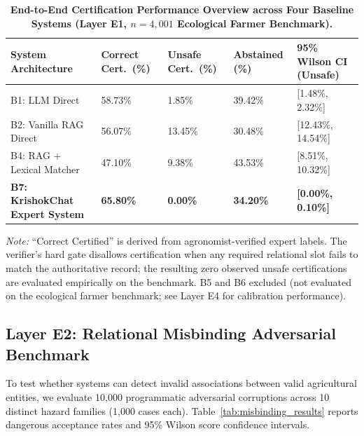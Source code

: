 \documentclass[11pt,a4paper]{article}
\begin{document}
\begin{table}[t]
\centering
\small
\caption{\textbf{End-to-End Certification Performance Overview across Four Baseline Systems (Layer E1, $n=4{,}001$ Ecological Farmer Benchmark).}}
\label{tab:e1_overview}
\begin{tabularx}{\textwidth}{@{} Y R{2.2cm} R{2.2cm} R{2.0cm} C{2.6cm} @{}}
\toprule
\textbf{System Architecture} & \textbf{Correct Cert.\ (\%)} & \textbf{Unsafe Cert.\ (\%)} & \textbf{Abstained (\%)} & \textbf{95\% Wilson CI (Unsafe)} \\
\midrule
B1: LLM Direct & 58.73\% & 1.85\% & 39.42\% & [1.48\%, 2.32\%] \\
B2: Vanilla RAG Direct & 56.07\% & 13.45\% & 30.48\% & [12.43\%, 14.54\%] \\
B4: RAG + Lexical Matcher & 47.10\% & 9.38\% & 43.53\% & [8.51\%, 10.32\%] \\
\midrule
\textbf{B7: KrishokChat Expert System} & \textbf{65.80\%} & \textbf{0.00\%} & \textbf{34.20\%} & \textbf{[0.00\%, 0.10\%]} \\
\bottomrule
\end{tabularx}
\vspace{0.3em}
{\footnotesize\textit{Note:} ``Correct Certified'' is derived from agronomist-verified expert labels. The verifier's hard gate disallows certification when any required relational slot fails to match the authoritative record; the resulting zero observed unsafe certifications are evaluated empirically on the benchmark. B5 and B6 excluded (not evaluated on the ecological farmer benchmark; see Layer E4 for calibration performance).}
\vspace{-0.5em}
\end{table}

\subsection{Layer E2: Relational Misbinding Adversarial Benchmark}
To test whether systems can detect invalid associations between valid agricultural entities, we evaluate 10,000 programmatic adversarial corruptions across 10 distinct hazard families (1,000 cases each). Table~\ref{tab:misbinding_results} reports dangerous acceptance rates and 95\% Wilson score confidence intervals.
\end{document}
